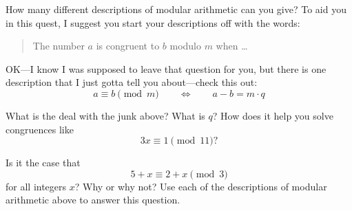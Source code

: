 \begin{question}
How many different descriptions of modular arithmetic can you give? To aid you in this quest, I suggest you start your descriptions off with the words:
\begin{quote}
The number $a$ is congruent to $b$ modulo $m$ when \dots
\end{quote}
\end{question}
\QM

OK---I know I was supposed to leave that question for you, but there
is one description that I just gotta tell you about---check this out:
\[
a \equiv b \pmod{m} \qquad \Leftrightarrow \qquad a - b = m\cdot q
\]

\begin{question} 
What is the deal with the junk above? What is $q$? How does it help
you solve congruences like
\[
3x \equiv 1 \pmod{11}?
\]
\end{question}
\QM

\begin{question}
Is it the case that 
\[
5+x \equiv 2 + x \pmod{3}
\]
for all integers $x$? Why or why not? Use each of the descriptions
of modular arithmetic above to answer this question.
\end{question}
\QM







\newpage

